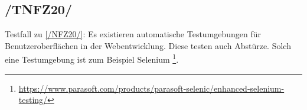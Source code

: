 \subsection*{/TNFZ20/}

\label{/TNFZ20/} Testfall zu \ref{/NFZ20/}: Es existieren automatische Testumgebungen für Benutzeroberflächen in der Webentwicklung.
Diese testen auch Abstürze.
Solch eine Testumgebung ist zum Beispiel Selenium \footnote{\href{https://www.parasoft.com/products/parasoft-selenic/enhanced-selenium-testing/}{https://www.parasoft.com/products/parasoft-selenic/enhanced-selenium-testing/}}.